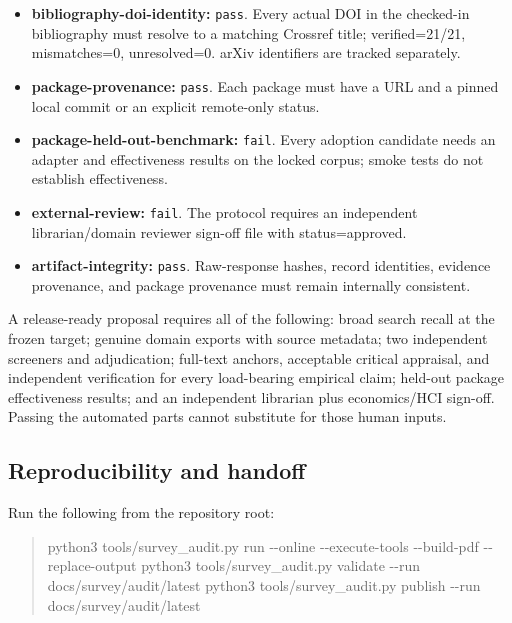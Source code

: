 \documentclass[11pt]{article}
\newenvironment{Shaded}{\begin{quote}\small}{\end{quote}}
\newcommand{\NormalTok}[1]{#1}
\newcommand{\ExtensionTok}[1]{#1}
\begin{document}
\begin{itemize}
\item
  \textbf{bibliography-doi-identity:} \texttt{pass}. Every actual DOI in the checked-in bibliography must resolve to a matching Crossref title; verified=21/21, mismatches=0, unresolved=0. arXiv identifiers are tracked separately.
\item
  \textbf{package-provenance:} \texttt{pass}. Each package must have a URL and a pinned local commit or an explicit remote-only status.
\item
  \textbf{package-held-out-benchmark:} \texttt{fail}. Every adoption candidate needs an adapter and effectiveness results on the locked corpus; smoke tests do not establish effectiveness.
\item
  \textbf{external-review:} \texttt{fail}. The protocol requires an independent librarian/domain reviewer sign-off file with status=approved.
\item
  \textbf{artifact-integrity:} \texttt{pass}. Raw-response hashes, record identities, evidence provenance, and package provenance must remain internally consistent.
\end{itemize}

A release-ready proposal requires all of the following: broad search recall at the frozen target; genuine domain exports with source metadata; two independent screeners and adjudication; full-text anchors, acceptable critical appraisal, and independent verification for every load-bearing empirical claim; held-out package effectiveness results; and an independent librarian plus economics/HCI sign-off. Passing the automated parts cannot substitute for those human inputs.

\hypertarget{reproducibility-and-handoff}{%
\subsection{Reproducibility and handoff}\label{reproducibility-and-handoff}}

Run the following from the repository root:

\begin{Shaded}
\begin{Highlighting}[]
\ExtensionTok{python3}\NormalTok{ tools/survey\_audit.py run {-}{-}online {-}{-}execute{-}tools {-}{-}build{-}pdf {-}{-}replace{-}output}
\ExtensionTok{python3}\NormalTok{ tools/survey\_audit.py validate {-}{-}run docs/survey/audit/latest}
\ExtensionTok{python3}\NormalTok{ tools/survey\_audit.py publish {-}{-}run docs/survey/audit/latest}
\end{Highlighting}
\end{Shaded}
\end{document}
